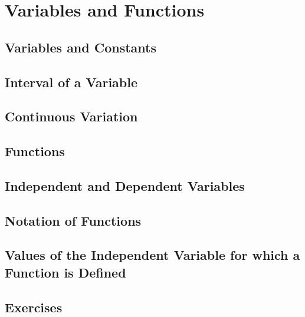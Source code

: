 \chapter{Variables and Functions}
\label{ch:02}

\section{Variables and Constants}
\label{sec:02:01}

\section{Interval of a Variable}
\label{sec:02:02}

\section{Continuous Variation}
\label{sec:02:03}

\section{Functions}
\label{sec:02:04}

\section{Independent and Dependent Variables}
\label{sec:02:05}

\section{Notation of Functions}
\label{sec:02:06}

\section[Values for which a Function is Defined]{Values of the Independent Variable for which a Function is Defined}
\label{sec:02:07}

\section{Exercises}
\label{sec:02:08}
